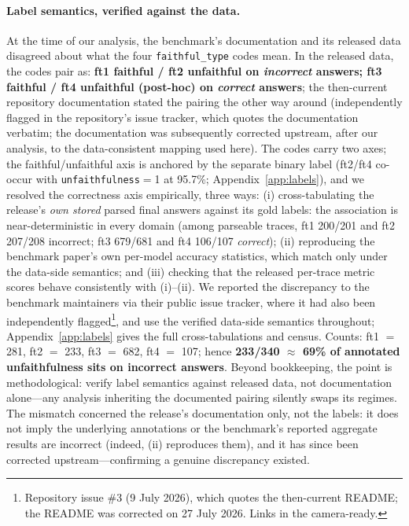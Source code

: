 \documentclass[11pt]{article}
\begin{document}
\paragraph{Label semantics, verified against the data.}
\label{sec:labels}
At the time of our analysis, the benchmark's documentation and its released data disagreed about what the four \texttt{faithful\_type} codes mean. In the released data, the codes pair as: \textbf{ft1 faithful / ft2 unfaithful on \emph{incorrect} answers; ft3 faithful / ft4 unfaithful (post-hoc) on \emph{correct} answers}; the then-current repository documentation stated the pairing the other way around (independently flagged in the repository's issue tracker, which quotes the documentation verbatim; the documentation was subsequently corrected upstream, after our analysis, to the data-consistent mapping used here). The codes carry two axes; the faithful/unfaithful axis is anchored by the separate binary label (ft2/ft4 co-occur with \texttt{unfaithfulness}$=$1 at 95.7\%; Appendix~\ref{app:labels}), and we resolved the correctness axis empirically, three ways: (i) cross-tabulating the release's \emph{own stored} parsed final answers against its gold labels: the association is near-deterministic in every domain (among parseable traces, ft1 200/201 and ft2 207/208 incorrect; ft3 679/681 and ft4 106/107 \emph{correct}); (ii) reproducing the benchmark paper's own per-model accuracy statistics, which match only under the data-side semantics; and (iii) checking that the released per-trace metric scores behave consistently with (i)--(ii). We reported the discrepancy to the benchmark maintainers via their public issue tracker, where it had also been independently flagged\footnote{Repository issue \#3 (9 July 2026), which quotes the then-current README; the README was corrected on 27 July 2026. Links in the camera-ready.}, and use the verified data-side semantics throughout; Appendix~\ref{app:labels} gives the full cross-tabulations and census. Counts: ft1 $=$ 281, ft2 $=$ 233, ft3 $=$ 682, ft4 $=$ 107; hence \textbf{233/340 $\approx$ 69\% of annotated unfaithfulness sits on incorrect answers}. Beyond bookkeeping, the point is methodological: verify label semantics against released data, not documentation alone---any analysis inheriting the documented pairing silently swaps its regimes. The mismatch concerned the release's documentation only, not the labels: it does not imply the underlying annotations or the benchmark's reported aggregate results are incorrect (indeed, (ii) reproduces them), and it has since been corrected upstream---confirming a genuine discrepancy existed.
\end{document}
